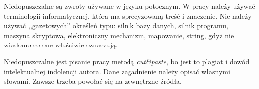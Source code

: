 Niedopuszczalne są zwroty używane w języku potocznym. W pracy należy używać terminologii informatycznej, która ma 
sprecyzowaną treść i znaczenie. Nie należy używać ,,gazetowych'' określeń typu: 
silnik bazy danych, silnik programu, maszyna skryptowa, elektroniczny mechanizm, mapowanie, string, gdyż nie wiadomo 
co one właściwie oznaczają. 

Niedopuszczalne jest pisanie pracy metodą \emph{cut\&paste}, bo jest to plagiat i dowód intelektualnej indolencji autora.
Dane zagadnienie należy opisać własnymi słowami. Zawsze trzeba powołać się na zewnętrzne źródła. 


